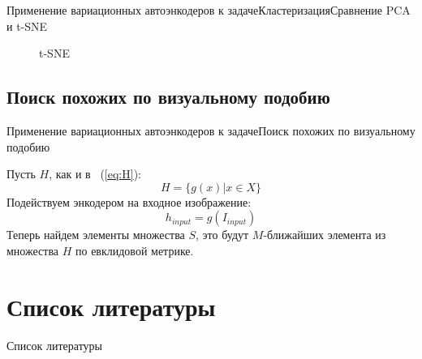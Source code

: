 \documentclass{beamer}
\begin{document}
\begin{frame}{Применение вариационных автоэнкодеров к задаче}{Кластеризация}{Сравнение PCA и t-SNE}

\begin{figure}[h]{t-SNE}
\label{fig:images_t_sne}
\end{figure}

\end{frame}

\subsection{Поиск похожих по визуальному подобию}

\begin{frame}{Применение вариационных автоэнкодеров к задаче}{Поиск похожих по визуальному подобию}

Пусть $H$, как и в ~(\ref{eq:H}): $$H = \{g(x) | x \in X\}$$
Подействуем энкодером на входное изображение: $$h_{input} = g(I_{input})$$
Теперь найдем элементы множества $S$, это будут $M$-ближайших элемента из множества $H$ по евклидовой метрике.

\end{frame}

\section{Список литературы}

\begin{frame}{Список литературы}


\nocite{*}
\end{frame}
\end{document}
